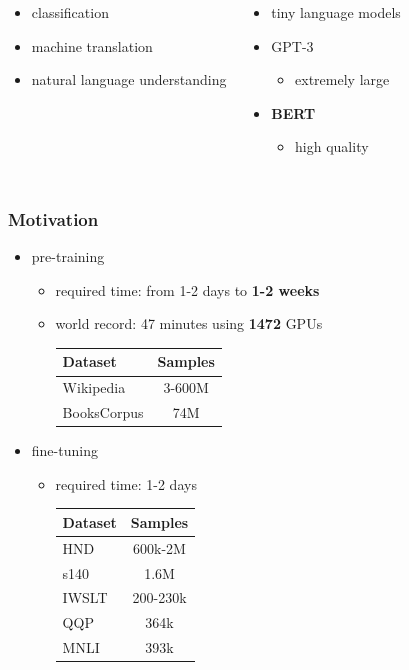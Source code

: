 \documentclass{beamer}
\begin{document}
\begin{frame}
\begin{columns}
\begin{itemize}
		\item classification
		\item machine translation
		\item natural language understanding
	\end{itemize}
	\begin{itemize}
		\item tiny language models
		\item GPT-3
			\begin{itemize}
				\item extremely large
			\end{itemize}
		\item {\bf BERT}
			\begin{itemize}
				\item high quality
			\end{itemize}
	\end{itemize}
\end{columns}
\end{frame}

\begin{frame}
	\frametitle{Motivation}
	\begin{itemize}
		\item pre-training
			\begin{itemize}
				\item required time: from 1-2 days to {\bf 1-2 weeks}
				\item world record: 47 minutes using {\bf 1472} GPUs

					\begin{table}
						\begin{tabular}{l|c}
							Dataset & Samples \\
							\hline\hline
							Wikipedia & 3-600M \\
							BooksCorpus & 74M\\
						\end{tabular}
					\end{table}
			\end{itemize}
		\item fine-tuning
			\begin{itemize}
				\item required time: 1-2 days

					\begin{table}
						\begin{tabular}{l|c}
							Dataset & Samples \\
							\hline\hline
							HND & 600k-2M \\
							s140 & 1.6M \\
							IWSLT & 200-230k \\
							QQP & 364k \\
							MNLI & 393k \\
						\end{tabular}
					\end{table}
			\end{itemize}
	\end{itemize}
\end{frame}
\end{document}
